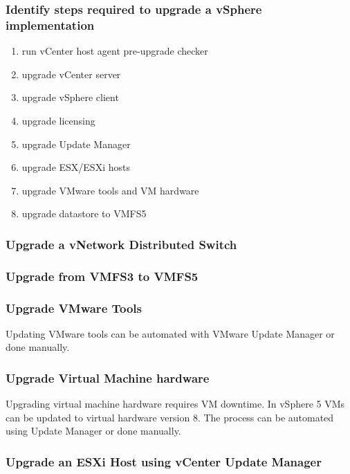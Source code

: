 \subsubsection{Identify steps required to upgrade a vSphere implementation}

\begin{enumerate}
\item run vCenter host agent pre-upgrade checker
\item upgrade vCenter server
\item upgrade vSphere client
\item upgrade licensing
\item upgrade Update Manager
\item upgrade ESX/ESXi hosts
\item upgrade VMware tools and VM hardware
\item upgrade datastore to VMFS5
\end{enumerate}

\subsubsection{Upgrade a vNetwork Distributed Switch}

\subsubsection{Upgrade from VMFS3 to VMFS5}

\subsubsection{Upgrade VMware Tools}

Updating VMware tools can be automated with VMware Update Manager or done
manually.

\subsubsection{Upgrade Virtual Machine hardware}

Upgrading virtual machine hardware requires VM downtime. In vSphere 5 VMs
can be updated to virtual hardware version 8. The process can be automated
using Update Manager or done manually.

\subsubsection{Upgrade an ESXi Host using vCenter Update Manager}

